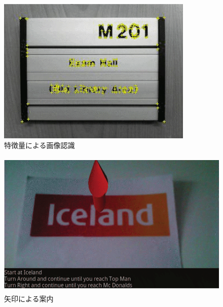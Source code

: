 \begin{figure}[H]
  \centering 
  \includegraphics[height=70mm]{images/FBINUAR_image.png}
  \caption{特徴量による画像認識} \label{fig:FBINUAR_image}
\end{figure}
\begin{figure}[H]
  \centering 
  \includegraphics[height=70mm]{images/FBINUAR_ar.png}
  \caption{矢印による案内} \label{fig:FBINUAR_ar}
\end{figure}


